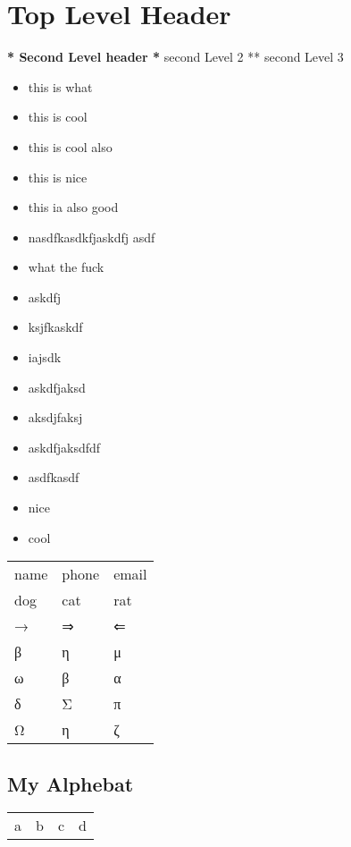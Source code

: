 \documentclass[11pt]{article}
\begin{document}
\section{Top Level Header}
\label{sec:org95b5c20}
\textbf{* Second Level header
*} second Level 2
** second Level 3
\begin{itemize}
\item this is what
\item this is cool
\item this is cool also
\item this is nice
\item this ia also good
\item nasdfkasdkfjaskdfj asdf
\item what the fuck
\item askdfj
\item ksjfkaskdf
\item iajsdk
\item askdfjaksd
\item aksdjfaksj
\item askdfjaksdfdf
\item asdfkasdf
\item nice
\item cool
\end{itemize}
\begin{center}
\begin{tabular}{lll}
name & phone & email\\
dog & cat & rat\\
→ & ⇒ & ⇐\\
β & η & μ\\
ω & β & α\\
δ & Σ & π\\
Ω & η & ζ\\
\end{tabular}
\end{center}

\subsection{My Alphebat}
\label{sec:org0ddcaeb}
\begin{center}
\begin{tabular}{llll}
a & b & c & d\\
\end{tabular}
\end{center}
\end{document}
